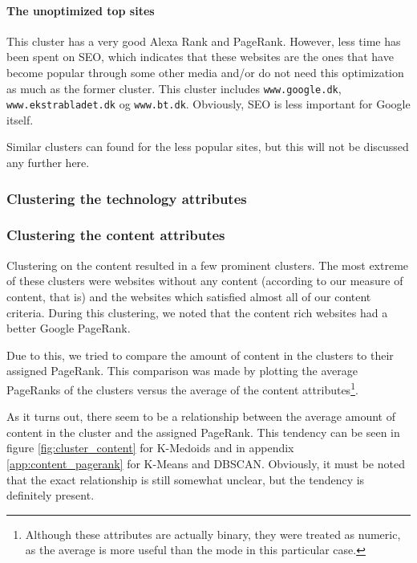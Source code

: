 \paragraph{The unoptimized top sites} This cluster has a very good Alexa Rank and PageRank. However, less time has been spent on SEO, which indicates that these websites are the ones that have become popular through some other media and/or do not need this optimization as much as the former cluster. This cluster includes \verb|www.google.dk|, \verb|www.ekstrabladet.dk| og \verb|www.bt.dk|. Obviously, SEO is less important for Google itself.

Similar clusters can found for the less popular sites, but this will not be discussed any further here.

\subsubsection{Clustering the technology attributes}

\subsubsection{Clustering the content attributes}

Clustering on the content resulted in a few prominent clusters. The most extreme of these clusters were websites without any content (according to our measure of content, that is) and the websites which satisfied almost all of our content criteria. During this clustering, we noted that the content rich websites had a better Google PageRank.

Due to this, we tried to compare the amount of content in the clusters to their assigned PageRank. This comparison was made by plotting the average PageRanks of the clusters versus the average of the content attributes\footnote{Although these attributes are actually binary, they were treated as numeric, as the average is more useful than the mode in this particular case.}. 

As it turns out, there seem to be a relationship between the average amount of content in the cluster and the assigned PageRank. This tendency can be seen in figure \ref{fig:cluster_content} for K-Medoids and in appendix \ref{app:content_pagerank} for K-Means and DBSCAN. Obviously, it must be noted that the exact relationship is still somewhat unclear, but the tendency is definitely present.


